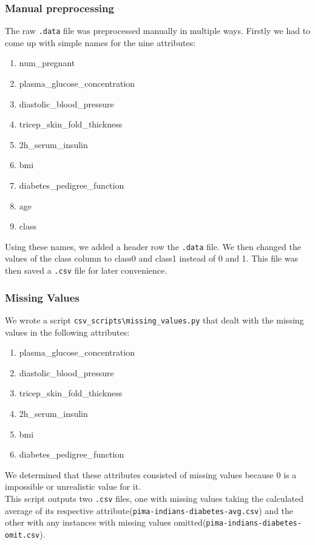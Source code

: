 \documentclass{article}
\renewcommand{\tt}{\texttt}
\begin{document}
\subsubsection{Manual preprocessing}
The raw \tt{.data} file was preprocessed manually in multiple ways. Firstly we had to come up with simple names for the nine attributes:
\begin{enumerate}[1.]
\item num\_pregnant
\item plasma\_glucose\_concentration
\item diastolic\_blood\_pressure
\item tricep\_skin\_fold\_thickness
\item 2h\_serum\_insulin
\item bmi
\item diabetes\_pedigree\_function
\item age
\item class
\end{enumerate}
Using these names, we added a header row the \tt{.data} file. We then changed the values of the class column to class0 and class1 instead of 0 and 1. This file was then saved a \tt{.csv} file for later convenience.

\subsubsection{Missing Values}
We wrote a script \tt{csv\_scripts\textbackslash missing\_values.py} that dealt with the missing values in the following attributes:
\begin{enumerate}[1.]
\item plasma\_glucose\_concentration
\item diastolic\_blood\_pressure
\item tricep\_skin\_fold\_thickness
\item 2h\_serum\_insulin
\item bmi
\item diabetes\_pedigree\_function
\end{enumerate} 

We determined that these attributes consisted of missing values because 0 is a impossible or unrealistic value for it.\\

This script outputs two \tt{.csv} files, one with missing values taking the calculated average of its respective attribute(\tt{pima-indians-diabetes-avg.csv}) and the other with any instances with missing values omitted(\tt{pima-indians-diabetes-omit.csv}).\\
\end{document}
